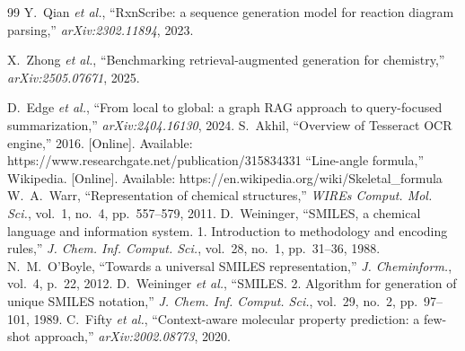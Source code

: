 \documentclass[conference]{IEEEtran}
\begin{document}
\begin{thebibliography}{99}
 Y.~Qian \textit{et al.}, ``RxnScribe: a sequence generation model for reaction diagram parsing,'' \textit{arXiv:2302.11894}, 2023.

 X.~Zhong \textit{et al.}, ``Benchmarking retrieval-augmented generation for chemistry,'' \textit{arXiv:2505.07671}, 2025.

 D.~Edge \textit{et al.}, ``From local to global: a graph RAG approach to query-focused summarization,'' \textit{arXiv:2404.16130}, 2024.
 S.~Akhil, ``Overview of Tesseract OCR engine,'' 2016. [Online]. Available: https://www.researchgate.net/publication/315834331
 ``Line-angle formula,'' Wikipedia. [Online]. Available: https://en.wikipedia.org/wiki/Skeletal\_formula
 W.~A.~Warr, ``Representation of chemical structures,'' \textit{WIREs Comput. Mol. Sci.}, vol.~1, no.~4, pp.~557--579, 2011.
 D.~Weininger, ``SMILES, a chemical language and information system. 1. Introduction to methodology and encoding rules,'' \textit{J. Chem. Inf. Comput. Sci.}, vol.~28, no.~1, pp.~31--36, 1988.
 N.~M.~O'Boyle, ``Towards a universal SMILES representation,'' \textit{J. Cheminform.}, vol.~4, p.~22, 2012.
 D.~Weininger \textit{et al.}, ``SMILES. 2. Algorithm for generation of unique SMILES notation,'' \textit{J. Chem. Inf. Comput. Sci.}, vol.~29, no.~2, pp.~97--101, 1989.
 C.~Fifty \textit{et al.}, ``Context-aware molecular property prediction: a few-shot approach,'' \textit{arXiv:2002.08773}, 2020.
\end{thebibliography}
\end{document}
